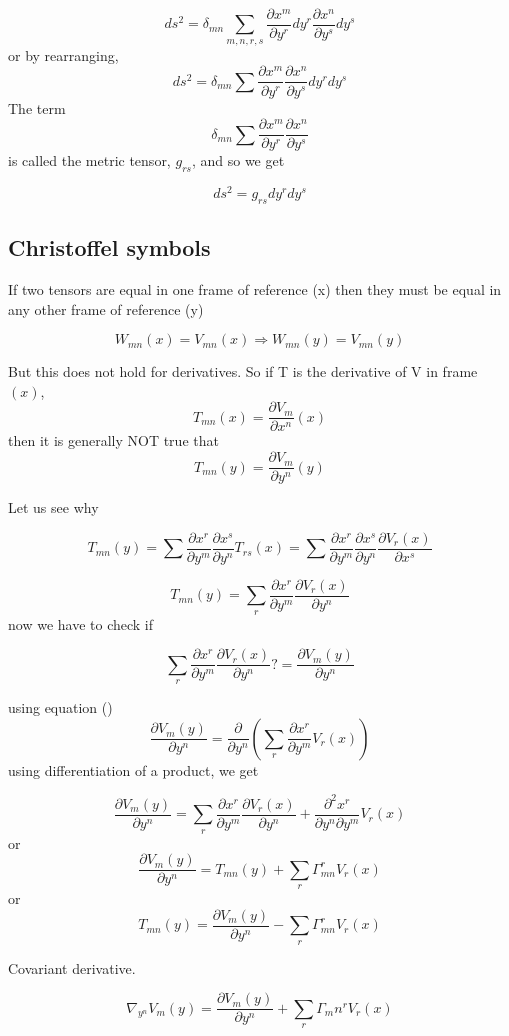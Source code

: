 \documentclass[empty]{article}
\newcommand{\dd}[2]{\frac{\partial #1}{\partial #2}}
\begin{document}
$$
  ds^2 = \delta_{mn} \sum_{m,n,r,s} \dd{x^m}{y^r} dy^r \dd{x^n}{y^s} dy^s 
$$
or by rearranging,
$$
  ds^2 = \delta_{mn} \sum \dd{x^m}{y^r}  \dd{x^n}{y^s} dy^r dy^s 
$$
The term 
$$
   \delta_{mn} \sum \dd{x^m}{y^r}  \dd{x^n}{y^s}  
$$
is called the metric tensor, $g_{rs}$, and so we get

$$
  ds^2 = g_{rs} dy^r dy^s 
$$


\subsection{Christoffel symbols}

If two tensors are equal in one frame of reference (x) then they must 
be equal in any other frame of reference (y)

$$
   W_{mn}(x) = V_{mn}(x) \Rightarrow W_{mn}(y) = V_{mn}(y) 
$$

But this does not hold for derivatives. So if T is the derivative of V in frame $(x)$, 
$$
   T_{mn} (x) = \dd{V_m}{x^n} (x)
$$
then it is generally NOT true that 
$$
   T_{mn} (y) = \dd{V_m}{y^n} (y)
$$

Let us see why

$$
   T_{mn}(y) = \sum \dd{x^r}{y^m}\dd{x^s}{y^n} T_{rs}(x) =
     \sum \dd{x^r}{y^m}\dd{x^s}{y^n} \dd{V_r(x)}{x^s}
$$

$$
   T_{mn}(y) = \sum_r \dd{x^r}{y^m} \dd{V_r(x)}{y^n}
$$
now we have to check if

$$
   \sum_r \dd{x^r}{y^m} \dd{V_r(x)}{y^n} ?= \dd{V_m(y)}{y^n}
$$

using equation ()
$$
  \dd{V_m(y)}{y^n} = \dd{}{y^n} \left ( \sum_r \dd{x^r}{y^m} V_r(x)  \right )
$$
using differentiation of a product, we get

$$
   \dd{V_m(y)}{y^n} = \sum_r \dd{x^r}{y^m}\dd{V_r(x)}{y^n} + \frac{\partial^2x^r}{\partial y^n\partial y^m } V_r(x)
$$
or
$$
   \dd{V_m(y)}{y^n} = T_{mn}(y) + \sum_r \Gamma_{mn}^r V_r(x)
$$
or
$$
 T_{mn}(y) =  \dd{V_m(y)}{y^n} - \sum_r \Gamma_{mn}^r V_r(x)
$$

Covariant derivative.

$$
   \nabla_{y^n}V_m(y) = \dd{V_m(y)}{y^n} + \sum_r \Gamma_mn^r V_r(x)
$$
\end{document}
